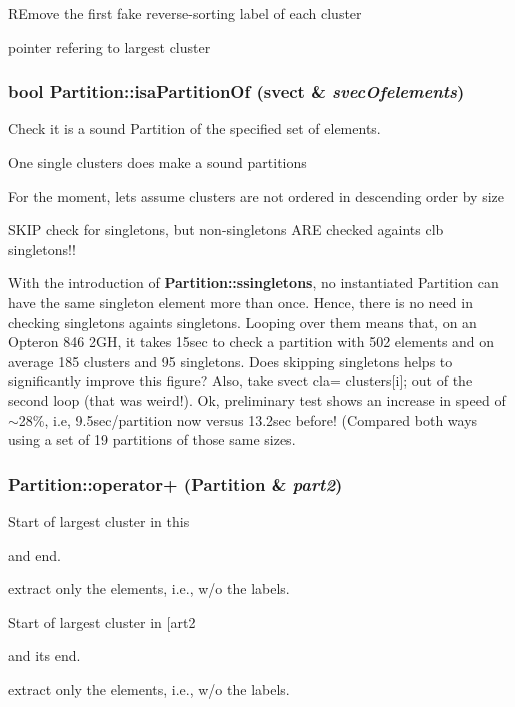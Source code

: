 REmove the first fake reverse-sorting label of each cluster

pointer refering to largest cluster 
\subsubsection{\setlength{\rightskip}{0pt plus 5cm}bool Partition::isa\-Partition\-Of (svect \& {\em svec\-Ofelements})}\label{classPartition_a4}


Check it is a sound Partition of the specified set of elements. 

One single clusters does make a sound partitions

For the moment, lets assume clusters are not ordered in descending order by size

SKIP check for singletons, but non-singletons ARE checked againts clb singletons!!

With the introduction of {\bf Partition::ssingletons}, no instantiated Partition can have the same singleton element more than once. Hence, there is no need in checking singletons againts singletons. Looping over them means that, on an Opteron 846 2GH, it takes 15sec to check a partition with 502 elements and on average 185 clusters and 95 singletons. Does skipping singletons helps to significantly improve this figure? Also, take svect cla= clusters[i]; out of the second loop (that was weird!). Ok, preliminary test shows an increase in speed of $\sim$28\%, i.e, 9.5sec/partition now versus 13.2sec before! (Compared both ways using a set of 19 partitions of those same sizes. 
\subsubsection{ Partition::operator+ ({\bf Partition} \& {\em part2})}\label{classPartition_a38}


Start of largest cluster in this

and end.

extract only the elements, i.e., w/o the labels.

Start of largest cluster in [art2

and its end.

extract only the elements, i.e., w/o the labels.

